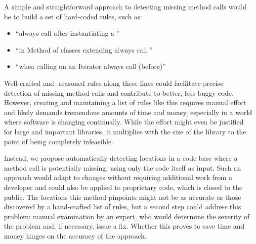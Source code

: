 A simple and straightforward approach to detecting missing method calls would be to build a set of hard-coded rules, such as:
\begin{itemize}
    \item ``always call  after instantiating a ''
    \item ``in Method  of classes extending  always call ''
    \item ``when calling  on an Iterator always call  (before)''
\end{itemize}
Well-crafted and -reasoned rules along these lines could facilitate precise detection of missing method calls and contribute to better, less buggy code.
However, creating and maintaining a list of rules like this requires manual effort and likely demands tremendous amounts of time and money, especially in a world where software is changing continually.
While the effort might even be justified for large and important libraries, it multiplies with the size of the library to the point of being completely infeasible.

Instead, we propose automatically detecting locations in a code base where a method call is potentially missing, using only the code itself as input.
Such an approach would adapt to changes without requiring additional work from a developer and could also be applied to proprietary code, which is closed to the public.
The locations this method pinpoints might not be as accurate as those discovered by a hand-crafted list of rules, but a second step could address this problem: manual examination by an expert, who would determine the severity of the problem and, if necessary, issue a fix.
Whether this proves to save time and money hinges on the accuracy of the approach.


